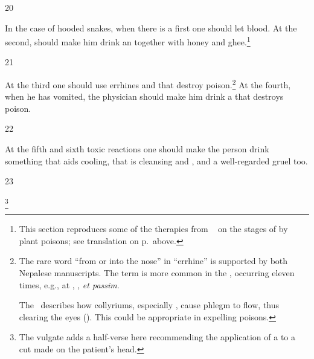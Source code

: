 \begin{translation}
\item [20]

In the case of hooded snakes, when there is a 
first one should let blood.  At the second,  should make him drink an 
 together with honey and ghee.\footnote{This
    section reproduces some of the therapies from  \SS\ 
    on the stages of  by plant poisons; see
    translation on p.\,\pageref{dusivisa} above.}
    

\item [21]

At the third one should use errhines and  that destroy
poison.\footnote{%
The rare word  “from or
    into the nose” in  “errhine” is supported by both
    Nepalese manuscripts.  The term is more common in the \CS, occurring
    eleven times, e.g., at , , \emph{et
    passim}.  
    
    The \CS\ describes how collyriums, especially , cause
phlegm to flow, thus clearing the eyes ().
This could be appropriate in expelling poisons.} At the fourth, when he
has vomited, the physician should make him drink a 
that destroys poison.

\item [22]

At the fifth and sixth toxic reactions one should make 
the
person drink something that aids cooling, that is cleansing
and , and a well-regarded gruel too.


    
\item [23]

\footnote{The vulgate adds a half-verse here recommending
    the application of a  to a cut made on the patient's 
    head.}



\end{translation}
